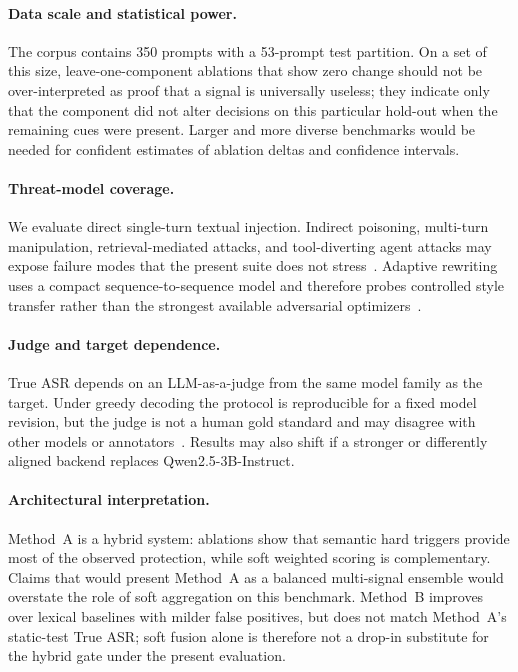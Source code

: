 ﻿\documentclass[10pt]{article}
\begin{document}
\paragraph{Data scale and statistical power.}
The corpus contains 350 prompts with a 53-prompt test partition.
On a set of this size, leave-one-component ablations that show zero change should not be over-interpreted as proof that a signal is universally useless; they indicate only that the component did not alter decisions on this particular hold-out when the remaining cues were present.
Larger and more diverse benchmarks would be needed for confident estimates of ablation deltas and confidence intervals.

\paragraph{Threat-model coverage.}
We evaluate direct single-turn textual injection.
Indirect poisoning, multi-turn manipulation, retrieval-mediated attacks, and tool-diverting agent attacks may expose failure modes that the present suite does not stress~\cite{greshake2023indirect,debenedetti2024agentdojo,wu2025epistemic}.
Adaptive rewriting uses a compact sequence-to-sequence model and therefore probes controlled style transfer rather than the strongest available adversarial optimizers~\cite{yi2024jailbreak,zizzo2025adversarial}.

\paragraph{Judge and target dependence.}
True ASR depends on an LLM-as-a-judge from the same model family as the target.
Under greedy decoding the protocol is reproducible for a fixed model revision, but the judge is not a human gold standard and may disagree with other models or annotators~\cite{zizzo2025adversarial}.
Results may also shift if a stronger or differently aligned backend replaces Qwen2.5-3B-Instruct.

\paragraph{Architectural interpretation.}
Method~A is a hybrid system: ablations show that semantic hard triggers provide most of the observed protection, while soft weighted scoring is complementary.
Claims that would present Method~A as a balanced multi-signal ensemble would overstate the role of soft aggregation on this benchmark.
Method~B improves over lexical baselines with milder false positives, but does not match Method~A's static-test True ASR; soft fusion alone is therefore not a drop-in substitute for the hybrid gate under the present evaluation.
\end{document}
